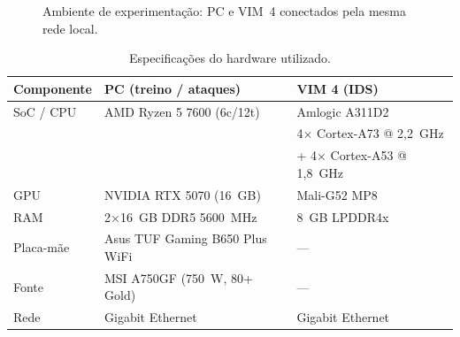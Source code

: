 \documentclass[12pt,a4paper]{article}
\begin{document}
\begin{figure}[ht]
{}
\caption{Ambiente de experimentação: PC e VIM~4 conectados pela mesma rede local.}
\label{fig:ambiente}
\end{figure}

\begin{table}[ht]
\centering
\caption{Especificações do hardware utilizado.}
\label{tab:hardware}
\begin{tabular}{@{}lll@{}}
\toprule
\textbf{Componente} & \textbf{PC (treino / ataques)} & \textbf{VIM 4 (IDS)} \\ \midrule
SoC / CPU & AMD Ryzen 5 7600 (6c/12t) & Amlogic A311D2 \\
          &                            & 4$\times$ Cortex-A73 @ 2,2~GHz \\
          &                            & + 4$\times$ Cortex-A53 @ 1,8~GHz \\
GPU       & NVIDIA RTX 5070 (16~GB)    & Mali-G52 MP8 \\
RAM       & 2$\times$16~GB DDR5 5600~MHz & 8~GB LPDDR4x \\
Placa-mãe & Asus TUF Gaming B650 Plus WiFi & --- \\
Fonte     & MSI A750GF (750~W, 80+ Gold) & --- \\
Rede      & Gigabit Ethernet           & Gigabit Ethernet \\
\bottomrule
\end{tabular}
\end{table}
\end{document}
